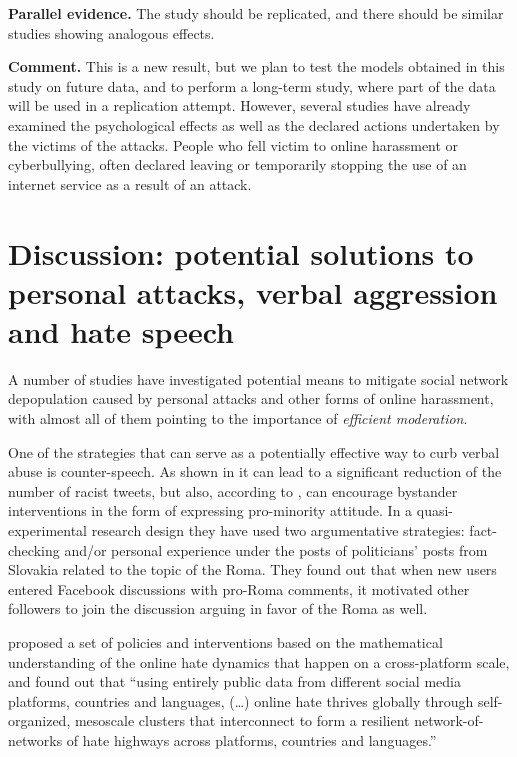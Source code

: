 \documentclass[a4paper,fleqn]{cas-dc}
\begin{document}
\begin{description}
\item \textbf{Parallel evidence.} The study should be replicated, and there should be similar studies showing analogous effects. 


\textbf{Comment.} This is a new result, but we plan to test the models obtained in this study on future data, and to perform a long-term study, where part of the data will be used in a replication attempt. However, several studies have already examined the psychological effects as well as the declared actions undertaken by the victims of the attacks. People who fell victim to online harassment or cyberbullying, often  declared leaving or temporarily stopping the use of an internet service as a result of an attack. 




\end{description}

\section{Discussion: potential solutions to personal attacks, verbal aggression and hate speech}
\label{discussion}

A number of studies have investigated potential means to mitigate social
network depopulation caused by personal attacks and other forms of
online harassment, with almost all of them pointing to the importance of
\textit{efficient moderation}.

One of the strategies that can serve as a potentially effective way to
curb verbal abuse is counter-speech. As shown in \citep{munger2017tweetment} it can
lead to a significant reduction of the number of racist tweets, but
also, according to \citet{mivskolci2020countering}, can encourage
bystander interventions in the form of expressing pro-minority attitude.
In a quasi-experimental research design they have used two argumentative
strategies: fact-checking and/or personal experience under the posts of
politicians' posts from Slovakia related to the topic of the Roma. They
found out that when new users entered Facebook discussions with pro-Roma
comments, it motivated other followers to join the discussion arguing in
favor of the Roma as well.

\citet{johnson2019hidden} proposed a set of policies and interventions
based on the mathematical understanding of the online hate dynamics that
happen on a cross-platform scale, and found out that ``using entirely
public data from different social media platforms, countries and
languages, (\dots) online hate thrives globally through self-organized,
mesoscale clusters that interconnect to form a resilient
network-of-networks of hate highways across platforms, countries and
languages.''
\end{document}
